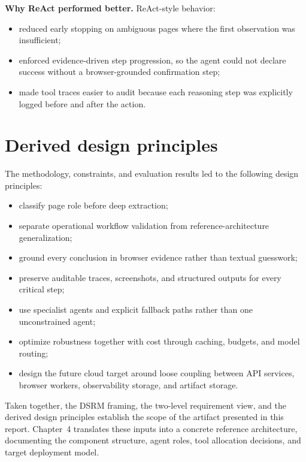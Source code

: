 \textbf{Why ReAct performed better.} ReAct-style behavior:
\begin{itemize}
  \item reduced early stopping on ambiguous pages where the first observation was
    insufficient;
  \item enforced evidence-driven step progression, so the agent could not declare
    success without a browser-grounded confirmation step;
  \item made tool traces easier to audit because each reasoning step was explicitly
    logged before and after the action.
\end{itemize}

\section{Derived design principles}

The methodology, constraints, and evaluation results led to the following design
principles:

\begin{itemize}
  \item classify page role before deep extraction;
  \item separate operational workflow validation from reference-architecture
    generalization;
  \item ground every conclusion in browser evidence rather than textual guesswork;
  \item preserve auditable traces, screenshots, and structured outputs for every
    critical step;
  \item use specialist agents and explicit fallback paths rather than one unconstrained
    agent;
  \item optimize robustness together with cost through caching, budgets, and model
    routing;
  \item design the future cloud target around loose coupling between API services,
    browser workers, observability storage, and artifact storage.
\end{itemize}

Taken together, the DSRM framing, the two-level requirement view, and the derived design
principles establish the scope of the artifact presented in this report. Chapter~4
translates these inputs into a concrete reference architecture, documenting the
component structure, agent roles, tool allocation decisions, and target deployment
model.
